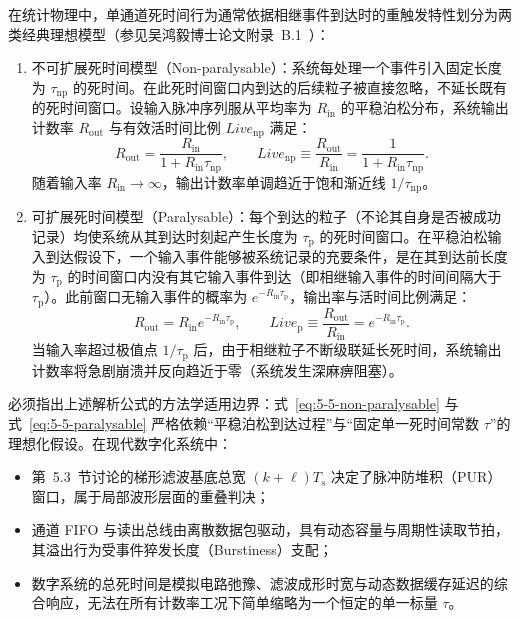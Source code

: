 在统计物理中，单通道死时间行为通常依据相继事件到达时的重触发特性划分为两类经典理想模型（参见吴鸿毅博士论文附录~B.1~\cite[印刷第~115--116~页]{wu-hongyi-2020-general-purpose-digital-daq-thesis}）：
\begin{enumerate}
\item 不可扩展死时间模型（Non-paralysable）：系统每处理一个事件引入固定长度为 $\tau_{\mathrm{np}}$ 的死时间。在此死时间窗口内到达的后续粒子被直接忽略，不延长既有的死时间窗口。设输入脉冲序列服从平均率为 $R_{\mathrm{in}}$ 的平稳泊松分布，系统输出计数率 $R_{\mathrm{out}}$ 与有效活时间比例 $Live_{\mathrm{np}}$ 满足：
\begin{equation}\label{eq:5-5-non-paralysable}
R_{\mathrm{out}} = \frac{R_{\mathrm{in}}}{1 + R_{\mathrm{in}} \tau_{\mathrm{np}}}, \qquad Live_{\mathrm{np}} \equiv \frac{R_{\mathrm{out}}}{R_{\mathrm{in}}} = \frac{1}{1 + R_{\mathrm{in}} \tau_{\mathrm{np}}}.
\end{equation}
随着输入率 $R_{\mathrm{in}} \to \infty$，输出计数率单调趋近于饱和渐近线 $1/\tau_{\mathrm{np}}$。
\item 可扩展死时间模型（Paralysable）：每个到达的粒子（不论其自身是否被成功记录）均使系统从其到达时刻起产生长度为 $\tau_{\mathrm{p}}$ 的死时间窗口。在平稳泊松输入到达假设下，一个输入事件能够被系统记录的充要条件，是在其到达前长度为 $\tau_{\mathrm{p}}$ 的时间窗口内没有其它输入事件到达（即相继输入事件的时间间隔大于 $\tau_{\mathrm{p}}$）。此前窗口无输入事件的概率为 $e^{-R_{\mathrm{in}} \tau_{\mathrm{p}}}$，输出率与活时间比例满足：
\begin{equation}\label{eq:5-5-paralysable}
R_{\mathrm{out}} = R_{\mathrm{in}} e^{-R_{\mathrm{in}} \tau_{\mathrm{p}}}, \qquad Live_{\mathrm{p}} \equiv \frac{R_{\mathrm{out}}}{R_{\mathrm{in}}} = e^{-R_{\mathrm{in}} \tau_{\mathrm{p}}}.
\end{equation}
当输入率超过极值点 $1/\tau_{\mathrm{p}}$ 后，由于相继粒子不断级联延长死时间，系统输出计数率将急剧崩溃并反向趋近于零（系统发生深麻痹阻塞）。
\end{enumerate}

必须指出上述解析公式的方法学适用边界：式~\eqref{eq:5-5-non-paralysable} 与式~\eqref{eq:5-5-paralysable} 严格依赖“平稳泊松到达过程”与“固定单一死时间常数 $\tau$”的理想化假设。在现代数字化系统中：
\begin{itemize}
\item 第~5.3~节讨论的梯形滤波基底总宽 $(k+\ell)T_s$ 决定了脉冲防堆积（PUR）窗口，属于局部波形层面的重叠判决；
\item 通道 FIFO 与读出总线由离散数据包驱动，具有动态容量与周期性读取节拍，其溢出行为受事件猝发长度（Burstiness）支配；
\item 数字系统的总死时间是模拟电路弛豫、滤波成形时宽与动态数据缓存延迟的综合响应，无法在所有计数率工况下简单缩略为一个恒定的单一标量 $\tau$。
\end{itemize}

